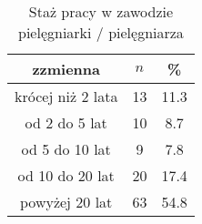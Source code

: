 \begin{table}[H]
\caption{Staż pracy w zawodzie pielęgniarki / pielęgniarza}
\centering
\begin{tabular}{ | c | c | c |}
\hline
zzmienna & $n$ & \% \\
\hline
krócej niż 2 lata  &  13  & 11.3\\
\hline
od 2 do 5 lat  &  10  & 8.7 \\
\hline
od 5 do 10 lat  &  9  & 7.8\\
\hline
od 10 do 20 lat  &  20  & 17.4\\
\hline
powyżej 20 lat  &  63  & 54.8 \\
\hline
\end{tabular}
\label{tab:Q1}
\end{table}

